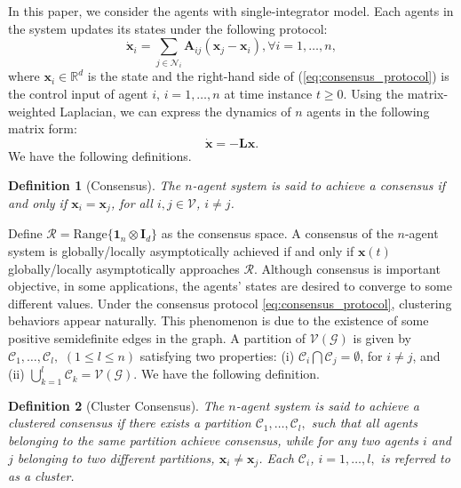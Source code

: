 \documentclass[draftclsnofoot,11pt,onecolumn]{IEEEtran}
\newtheorem{Definition}{Definition}
\newcommand{\m}[1]{\mathbf{#1}}
\newcommand{\mc}[1]{\mathcal{#1}}
\newcommand{\mb}[1]{\mathbb{#1}}
\begin{document}
In this paper, we consider the agents with single-integrator model. Each agents in the system updates its states under the following protocol:
\begin{equation} \label{eq:consensus_protocol}
\dot{\m{x}}_i = \sum\limits_{j \in \mc{N}_i} \m{A}_{ij} (\m{x}_j  - \m{x}_i), \forall i = 1, \ldots, n,
\end{equation}
where $\m{x}_i \in \mb{R}^d$ is the state and the right-hand side of (\ref{eq:consensus_protocol}) is the control input of agent $i$, $i = 1, \ldots, n$ at time instance $t\geq 0$. Using the matrix-weighted Laplacian, we can express the dynamics of $n$ agents in the following matrix form:
\begin{equation} \label{eq:consensus}
\dot{\m{x}} = -\m{L} \m{x}.
\end{equation}
We have the following definitions.
\begin{Definition}[Consensus] \label{def:consensus} The $n$-agent system is said to  achieve a consensus if and only if $\m{x}_i = \m{x}_j$, for all $i, j \in \mc{V}$, $i \neq j$.
\end{Definition}
Define $\mc{R} = \text{Range} \{ \m{1}_n \otimes \m{I}_{d}\}$ as the consensus space. A consensus of the $n$-agent system is globally/locally asymptotically achieved if and only if $\m{x}(t)$ globally/locally asymptotically approaches $\mc{R}$. Although consensus is important objective, in some applications, the agents' states are desired to converge to some different values. Under the consensus protocol \eqref{eq:consensus_protocol}, clustering behaviors appear naturally. This phenomenon is due to the existence of some positive semidefinite edges in the graph. A partition of $\mc{V}(\mc{G})$ is given by $\mc{C}_1,\ldots, \mc{C}_l,$ $(1\leq l \leq n)$ satisfying two properties: (i) $\mc{C}_i \bigcap \mc{C}_j = \emptyset$, for $i \neq j$, and (ii) $\bigcup_{k=1}^l \mc{C}_k = \mc{V}(\mc{G})$. We have the following definition.

\begin{Definition}[Cluster Consensus] \label{def:stability} The $n$-agent system is said to achieve a clustered consensus if there exists a partition $\mc{C}_1,\ldots, \mc{C}_l,$ such that all agents belonging to the same partition achieve consensus, while for any two agents $i$ and $j$ belonging to two different partitions, $\m{x}_i \neq \m{x}_j$. Each $\mc{C}_i$, $i =1, \ldots, l,$ is referred to as a cluster.
\end{Definition}
\end{document}
